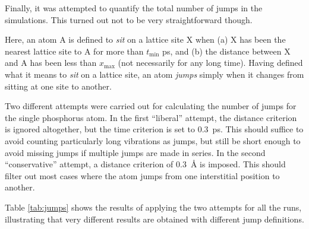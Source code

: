 \documentclass[11pt,bibliography=totoc,index=totoc]{scrbook}   %
\begin{document}


Finally, it was attempted to quantify the total number of jumps in the simulations. 
This turned out not to be very straightforward though.

Here, an atom A is defined to \emph{sit} on a lattice site X when (a) X has been the nearest lattice site to A for more than $t_{\text{min}}$ ps, and (b) the distance between X and A has been less than $x_{\text{max}}$ (not necessarily for any long time). 
Having defined what it means to \emph{sit} on a lattice site, an atom \emph{jumps} simply when it changes from sitting at one site to another.

Two different attempts were carried out for calculating the number of jumps for the single phosphorus atom.
In the first ``liberal'' attempt, the distance criterion is ignored altogether, but the time criterion is set to 0.3~ps.
This should suffice to avoid counting particularly long vibrations as jumps, but still be short enough to avoid missing jumps if multiple jumps are made in series. 
In the second ``conservative'' attempt, a distance criterion of 0.3~Å is imposed. This should filter out most cases where the atom jumps from one interstitial position to another. 

Table \ref{tab:jumps} shows the results of applying the two attempts for all the runs, illustrating that very different results are obtained 
with different jump definitions. 

\end{document}
